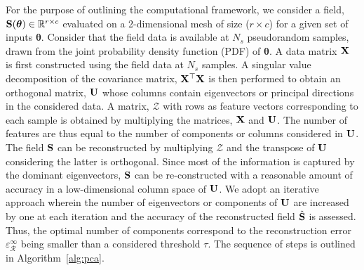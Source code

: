 For the purpose of outlining the computational framework, we consider a field,
$\mathbf{{S}}(\bm{\theta})\in\mathbb{R}^{r\times c}$ evaluated on a 2-dimensional mesh of size ($r\times c$)
for a given set of inputs $\bm{\theta}$. Consider that the field data is available at $N_s$ pseudorandom
samples, drawn from the joint probability density function (PDF) of $\bm{\theta}$. A data matrix $\mathbf{{X}}$ is
first constructed using the field data at $N_s$ samples. A singular value decomposition of the covariance
matrix, $\mathbf{{X^\top X}}$ is then performed to obtain an orthogonal matrix, $\mathbf{{U}}$ whose columns 
contain eigenvectors or principal directions in the considered data. A matrix, $\mathcal{Z}$ with 
rows as feature vectors corresponding to each
sample is obtained by multiplying the matrices, $\mathbf{{X}}$ and $\mathbf{{U}}$. The number of features
are thus equal to the number of components or columns considered in $\mathbf{{U}}$. 
The field $\mathbf{{S}}$ can be reconstructed by multiplying $\mathcal{Z}$ and the transpose of $\mathbf{{U}}$
considering the latter is orthogonal. 
Since most of the information is captured by the dominant eigenvectors, $\mathbf{{S}}$ can be re-constructed with a
reasonable amount of accuracy in a low-dimensional column space of $\mathbf{{U}}$. We adopt an iterative
approach wherein the number of eigenvectors or components of $\mathbf{{U}}$ are increased by one at each iteration
and the accuracy of the reconstructed field $\hat{\mathbf{{S}}}$ is assessed. Thus, the optimal number of components
correspond to the reconstruction error~$\varepsilon_\mathcal{R}^\infty$ 
being smaller than a considered threshold $\tau$. The sequence of steps
is outlined in Algorithm~\ref{alg:pca}.
%
\bigskip
